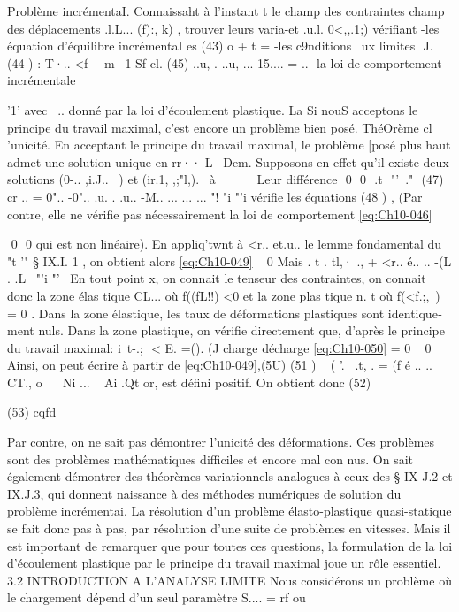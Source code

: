 Problème incrémentaI. Connaissaht à l'instant t le champ des contraintes champ des déplacements .l.L... (f):, k) , trouver leurs varia-et .u.l. 0<,,.1;) vérifiant -les équation d'équilibre incrémentaI es 
(43) o
+ t = 
-les c9nditions ~ux limites 
 J. 
(44 ) : 
T·..
<f~~ m~ 1 Sf 
cl.
(45) ..u, . 
..u, ... 15.... = .. 
-la loi de comportement incrémentale 

'1'
avec ~.. donné par la loi d'écoulement plastique.
La 
Si nouS acceptons le principe du travail maximal, c'est encore 
un problème bien posé. 
ThéOrème cl 'unicité. En acceptant le principe du travail maximal, le problème [posé plus haut admet une solution unique en rr·· 
L~ 
Dem. Supposons en effet qu'il existe deux solutions (0-.. ,i.J..~ ) et (ir.1, ,;"l,).
~à ~ ~~ ~ 
Leur différence 
 0  0  .t  "'\
." 
(47) cr .. = 0".. -0".. .u. . .u.. -M.. 
... ... ...
"! "i "'i 
vérifie les équations 
(48 ) , 
(Par contre, elle ne vérifie pas nécessairement la loi de comportement \eqref{eq:Ch10-046} 

 0  0 
qui est non linéaire). En appliq'twnt à <r.. et.u.. le lemme fondamental du "t '" 
§ IX.I. 1 , on obtient alors 
\eqref{eq:Ch10-049} ~ 0 Mais 
. t . tl,· .,
+ <r.. é.. .. -(L . 
.L~ "'i "'~ 
En tout point x, on connait le tenseur des contraintes, on connait donc la 
zone élas tique CL... où f((fL!!) <0 et la zone plas tique n. t où f(<f.;,~) = 0 . 
Dans la zone élastique, les taux de déformations plastiques sont identique­
ment nuls. Dans la zone plastique, on vérifie directement que, d'après le 
principe du travail maximal: 
i\
t-.;  < E. =(). 
(J 
charge décharge 
\eqref{eq:Ch10-050} = 0 ~ 0 
Ainsi, on peut écrire à partir de \eqref{eq:Ch10-049},(5U) 
(51 ) 
~
( 
'.~ .t, . 
= (f é .. .. CT., o
~~ Ni ... ~ Ai
.Qt 
or, est défini positif. On obtient donc 
(52) 

(53) 
cqfd 


Par contre, on ne sait pas démontrer l'unicité des déformations. 
Ces problèmes sont des problèmes mathématiques difficiles et encore mal con­
nus. 
On sait également démontrer des théorèmes variationnels analogues à ceux des § IX J.2 et IX.J.3, qui donnent naissance à des méthodes numéri­ques de solution du problème incrémentai. La résolution d'un problème élas­to-plastique quasi-statique se fait donc pas à pas, par résolution d'une suite de problèmes en vitesses. Mais il est important de remarquer que pour toutes ces questions, la formulation de la loi d'écoulement plastique par le principe du travail maximal joue un rôle essentiel. 
3.2 INTRODUCTION A L'ANALYSE LIMITE 
Nous considérons un problème où le chargement dépend d'un seul paramètre 
S.... = rf ou 

